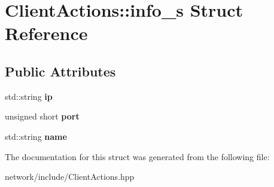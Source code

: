 \hypertarget{struct_client_actions_1_1info__s}{}\section{Client\+Actions\+:\+:info\+\_\+s Struct Reference}
\label{struct_client_actions_1_1info__s}
\subsection*{Public Attributes}
\begin{DoxyCompactItemize}
\item 
\mbox{\label{struct_client_actions_1_1info__s_ab528524bd528289790207c2517edd2fa}} 
std\+::string {\bfseries ip}
\item 
\mbox{\label{struct_client_actions_1_1info__s_ab8642f4638dbecee23852ef095bddfcc}} 
unsigned short {\bfseries port}
\item 
\mbox{\label{struct_client_actions_1_1info__s_a10d08c0de37e629e78a2c8685518eb9c}} 
std\+::string {\bfseries name}
\end{DoxyCompactItemize}


The documentation for this struct was generated from the following file\+:\begin{DoxyCompactItemize}
\item 
network/include/Client\+Actions.\+hpp\end{DoxyCompactItemize}
